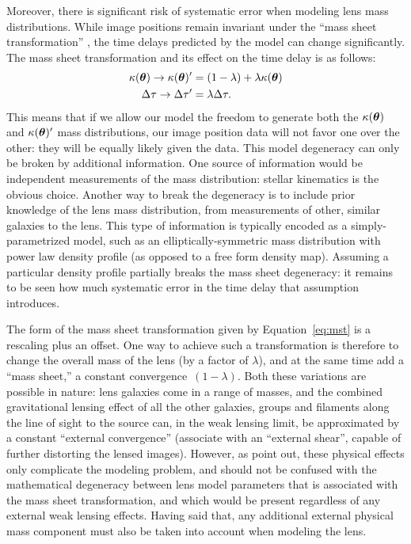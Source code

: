 Moreover, there is significant risk of systematic error when modeling
lens mass distributions. While image positions remain invariant under
the ``mass sheet transformation'' \citep{MSD} \citep[and its generalization, the source size transformation]{SST}, the time delays
predicted by the model can change significantly. The mass sheet transformation
and its effect on the time delay is as follows:
\begin{align}
    \kappa(\boldsymbol{\theta}) \rightarrow \kappa(\boldsymbol{\theta})' &= (1 - \lambda) + \lambda \kappa(\boldsymbol{\theta})  \label{eq:mst} \\
    \Delta \tau \rightarrow \Delta \tau' &= \lambda \Delta \tau.
\end{align}
This means that if we allow our model the freedom to generate both the
$\kappa(\boldsymbol{\theta})$ and $\kappa(\boldsymbol{\theta})'$ mass distributions, our image position
data will not favor one over the other: they will be equally likely
given the data. This model degeneracy can only be broken by additional
information. One source of information would be independent measurements
of the mass distribution: stellar kinematics is the obvious choice.
Another way to break the degeneracy is to include prior knowledge of the
lens mass distribution, from measurements of other, similar galaxies to
the lens. This type of information is typically encoded as a
simply-parametrized model, such as an elliptically-symmetric mass
distribution with power law density profile (as opposed to a free form
density map). Assuming a particular density profile partially breaks the
mass sheet degeneracy: it remains to be seen how much systematic error
in the time delay that assumption introduces.


The form of the mass sheet transformation given by Equation~\ref{eq:mst}
is a rescaling plus an offset. One way to achieve such a transformation
is therefore to change the overall mass of the lens (by a factor of
$\lambda$),   and at the same time add a ``mass sheet,'' a constant
convergence~$(1-\lambda)$.  Both these variations are possible in
nature: lens galaxies come in a range of masses, and  the combined
gravitational lensing effect of all the other galaxies, groups and
filaments along  the line of sight to the source can, in the weak
lensing limit, be approximated by a constant ``external convergence''
(associate with an ``external shear'', capable of further distorting the
lensed images). However, as \citet{S+S13} point out, these physical
effects only complicate the modeling problem, and should not be confused
with the mathematical degeneracy between lens model parameters that is
associated with the mass sheet transformation, and which would be
present regardless of any external weak lensing effects. Having said
that, any additional external physical mass component must also be taken
into account when modeling the lens.

